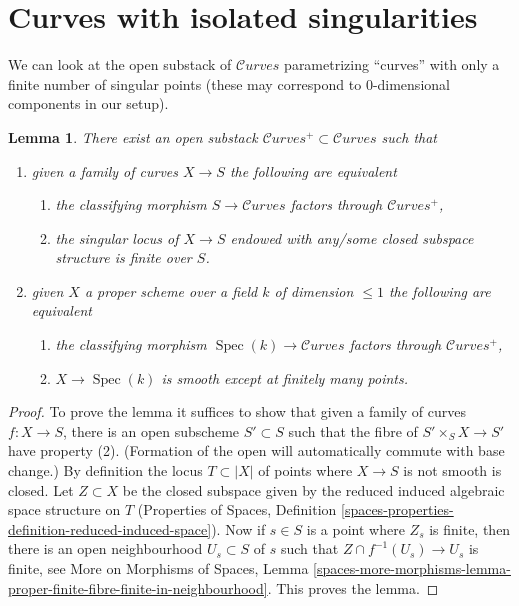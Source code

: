 \documentclass{stacks-project}
\theoremstyle{plain}
\newtheorem{lemma}[subsection]{Lemma}
\theoremstyle{definition}
\theoremstyle{remark}
\numberwithin{equation}{subsection}
\def\Spec{\mathop{\mathrm{Spec}}}
\def\Curvesstack{\mathcal{C}\!\mathit{urves}}
\begin{document}
\section{Curves with isolated singularities}
\label{section-curves-isolated}

\noindent
We can look at the open substack of $\Curvesstack$
parametrizing ``curves'' with only a finite number of singular
points (these may correspond to $0$-dimensional components
in our setup).

\begin{lemma}
\label{lemma-isolated-sings-curves}
There exist an open substack
$\Curvesstack^{+} \subset \Curvesstack$
such that
\begin{enumerate}
\item given a family of curves $X \to S$ the following are equivalent
\begin{enumerate}
\item the classifying morphism $S \to \Curvesstack$ factors through
$\Curvesstack^{+}$,
\item the singular locus of $X \to S$ endowed
with any/some closed subspace structure is finite over $S$.
\end{enumerate}
\item given $X$ a proper scheme over a field $k$ of dimension $\leq 1$
the following are equivalent
\begin{enumerate}
\item the classifying morphism $\Spec(k) \to \Curvesstack$ factors
through $\Curvesstack^{+}$,
\item $X \to \Spec(k)$ is smooth except at finitely many points.
\end{enumerate}
\end{enumerate}
\end{lemma}

\begin{proof}
To prove the lemma it suffices to show that given a family of curves
$f : X \to S$, there is an open subscheme $S' \subset S$
such that the fibre of $S' \times_S X \to S'$ have property (2).
(Formation of the open will automatically commute with base change.)
By definition the locus $T \subset |X|$ of points where $X \to S$
is not smooth is closed. Let $Z \subset X$ be the closed subspace
given by the reduced induced algebraic space structure on $T$
(Properties of Spaces, Definition
\ref{spaces-properties-definition-reduced-induced-space}).
Now if $s \in S$ is a point where $Z_s$ is finite, then there
is an open neighbourhood $U_s \subset S$ of $s$ such that
$Z \cap f^{-1}(U_s) \to U_s$ is finite, see
More on Morphisms of Spaces, Lemma
\ref{spaces-more-morphisms-lemma-proper-finite-fibre-finite-in-neighbourhood}.
This proves the lemma.
\end{proof}
\end{document}

